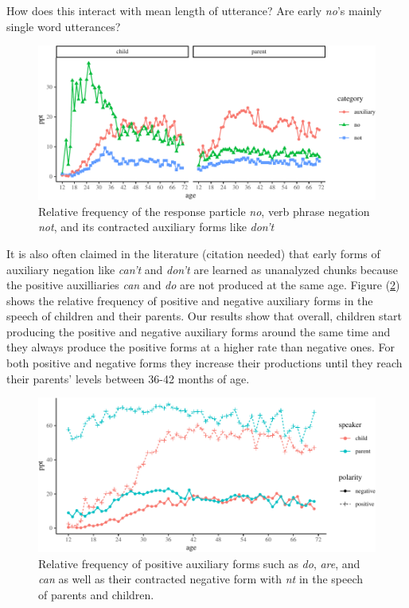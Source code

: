 \documentclass[man,floatsintext,draftall]{apa6}
\begin{document}
How does this interact with mean length of utterance? Are early \emph{no}'s mainly single word utterances?

\begin{figure}
\centering
\includegraphics{negation_production_files/figure-latex/negationRelativeFrequency-1.pdf}
\caption{\label{fig:negationRelativeFrequency}Relative frequency of the response particle \emph{no}, verb phrase negation \emph{not}, and its contracted auxiliary forms like \emph{don't}}
\end{figure}

It is also often claimed in the literature (citation needed) that early forms of auxiliary negation like \emph{can't} and \emph{don't} are learned as unanalyzed chunks because the positive auxilliaries \emph{can} and \emph{do} are not produced at the same age. Figure (\ref{fig:auxRelFreq}) shows the relative frequency of positive and negative auxiliary forms in the speech of children and their parents. Our results show that overall, children start producing the positive and negative auxiliary forms around the same time and they always produce the positive forms at a higher rate than negative ones. For both positive and negative forms they increase their productions until they reach their parents' levels between 36-42 months of age.

\begin{figure}
\centering
\includegraphics{negation_production_files/figure-latex/auxRelFreq-1.pdf}
\caption{\label{fig:auxRelFreq}Relative frequency of positive auxiliary forms such as \emph{do}, \emph{are}, and \emph{can} as well as their contracted negative form with \emph{nt} in the speech of parents and children.}
\end{figure}
\end{document}

